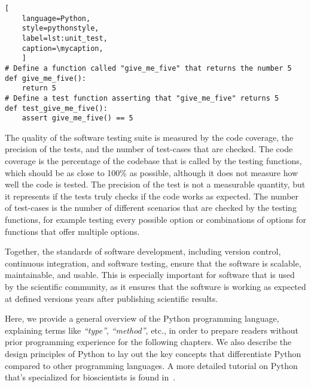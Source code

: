 \def\mycaption{ Example of an arbitrary Python function and its respective unit
    test function. The first function simply returns the number 5. The second
    function tests if the first function indeed returns the number 5. The test
    function is named with the prefix ``\texttt{test\_}'' and is placed in a
    file that ends with the suffix ``\texttt{\_test.py}''. Testing frameworks
    such as \texttt{pytest} scan the repository for files that end with
    ``\texttt{\_test.py}'' and execute the functions that start with
    ``\texttt{test\_}''. Note that code after ``\texttt{\#}'' is considered a
    comment and won't be executed.}
\begin{lstlisting}[
    language=Python, 
    style=pythonstyle,
    label=lst:unit_test, 
    caption=\mycaption,
    ]
# Define a function called "give_me_five" that returns the number 5
def give_me_five():
    return 5
# Define a test function asserting that "give_me_five" returns 5
def test_give_me_five():
    assert give_me_five() == 5 
\end{lstlisting}


The quality of the software testing suite is measured by the code coverage, the
precision of the tests, and the number of test-cases that are checked. The code
coverage is the percentage of the codebase that is called by the testing
functions, which should be as close to 100\% as possible, although it does not
measure how well the code is tested. The precision of the test is not a
measurable quantity, but it represents if the tests truly checks if the code
works as expected. The number of test-cases is the number of different scenarios
that are checked by the testing functions, for example testing every possible
option or combinations of options for functions that offer multiple options.

Together, the standards of software development, including version control,
continuous integration, and software testing, ensure that the software is
scalable, maintainable, and usable. This is especially important for software
that is used by the scientific community, as it ensures that the software is
working as expected at defined versions years after publishing scientific
results.

%
\label{sec:intro_python}%
Here, we provide a general overview of the Python programming language,
explaining terms like \textit{``type''}, \textit{``method''}, etc., in order to
prepare readers without prior programming experience for the following chapters.
We also describe the design principles of Python to lay out the key concepts
that differentiate Python compared to other programming languages. A more
detailed tutorial on Python that's specialized for bioscientists is found
in~\citealt{ekmekciIntroductionProgrammingBioscientists2016}.


